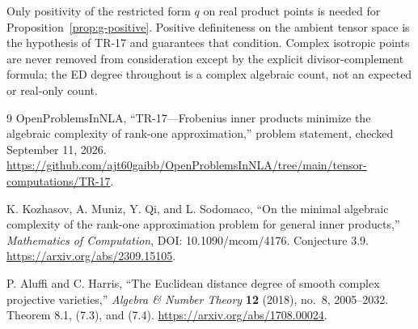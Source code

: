 \documentclass[11pt]{article}
\theoremstyle{remark}\newtheorem{remark}[theorem]{Remark}
\begin{document}
Only positivity of the restricted form $q$ on real product points is needed for Proposition~\ref{prop:g-positive}. Positive definiteness on the ambient tensor space is the hypothesis of TR-17 and guarantees that condition. Complex isotropic points are never removed from consideration except by the explicit divisor-complement formula; the ED degree throughout is a complex algebraic count, not an expected or real-only count.

\begin{thebibliography}{9}
OpenProblemsInNLA, ``TR-17---Frobenius inner products minimize the algebraic complexity of rank-one approximation,'' problem statement, checked September 11, 2026.
\url{https://github.com/ajt60gaibb/OpenProblemsInNLA/tree/main/tensor-computations/TR-17}.

K. Kozhasov, A. Muniz, Y. Qi, and L. Sodomaco,
``On the minimal algebraic complexity of the rank-one approximation problem for general inner products,''
\emph{Mathematics of Computation}, DOI: 10.1090/mcom/4176.
Conjecture 3.9. \url{https://arxiv.org/abs/2309.15105}.

P. Aluffi and C. Harris,
``The Euclidean distance degree of smooth complex projective varieties,''
\emph{Algebra \& Number Theory} \textbf{12} (2018), no.~8, 2005--2032.
Theorem 8.1, (7.3), and (7.4).
\url{https://arxiv.org/abs/1708.00024}.
\end{thebibliography}
\end{document}
